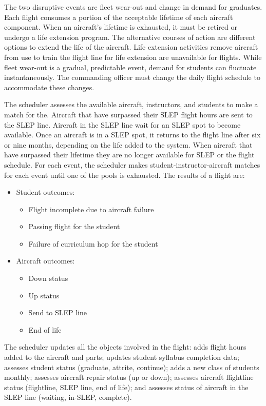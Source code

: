 The two disruptive events
are fleet wear-out and change in demand for graduates. Each flight
consumes a portion of the acceptable lifetime of each aircraft
component. When an aircraft's lifetime is exhausted, it must be
retired or undergo a life extension program. The alternative courses
of action are different options to extend the life of the
aircraft. Life extension activities remove aircraft from use to train
the flight line for life extension are unavailable for flights. While
fleet wear-out is a gradual, predictable event, demand for students
can fluctuate instantaneously.  The commanding officer must change the
daily flight schedule to accommodate these changes.


The scheduler assesses the available aircraft, instructors,
and students to make a match for the. Aircraft that have surpassed their SLEP flight hours are
sent to the SLEP line.  Aircraft in the SLEP line wait for an
SLEP spot to become available. Once an aircraft is in a SLEP spot, it
returns to the flight line after six or nine months, depending on the life
added to the system.  When aircraft that have surpassed their lifetime
they are no longer available for SLEP
or the flight schedule. For each event, the scheduler makes
student-instructor-aircraft matches for each event until one of the
pools is exhausted. The results of a flight are:
\begin{itemize}
\item Student outcomes:
  \begin{itemize}
  \item Flight incomplete due to aircraft failure
  \item Passing flight  for the student
  \item Failure of curriculum hop for the student
  \end{itemize}
\item Aircraft outcomes:
  \begin{itemize}
  \item Down status
  \item Up status
  \item Send to SLEP line
  \item End of life
  \end{itemize}
\end{itemize}

The scheduler updates all the objects involved in the flight: adds
flight hours added to the aircraft and parts; updates student syllabus
completion data; assesses student status (graduate, attrite,
continue); adds a new class of students monthly; assesses aircraft
repair status (up or down); assesses aircraft flightline status
(flightline, SLEP line, end of life); and assesses status of aircraft in
the SLEP line (waiting, in-SLEP, complete). 







